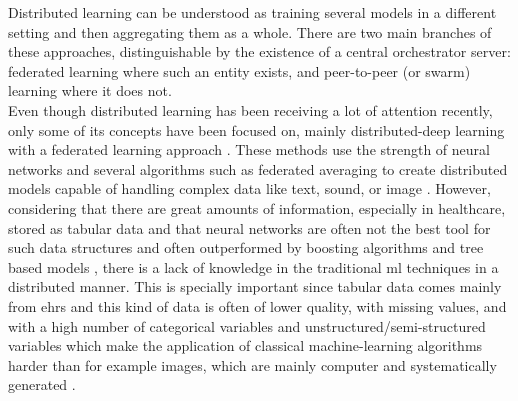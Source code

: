 
Distributed learning \cite{distributed} can be understood as training several models in a different setting and then aggregating them as a whole. There are two main branches of these approaches, distinguishable by the existence of a central orchestrator server: federated learning where such an entity exists, and peer-to-peer (or swarm) \cite{swarm_learning} learning where it does not. \\
Even though distributed learning has been receiving a lot of attention recently, only some of its concepts have been focused on, mainly distributed-deep learning with a federated learning approach \cite{xuFederatedLearningHealthcare2021,leeFederatedLearningClinical2020}. These methods use the strength of neural networks and several algorithms such as federated averaging to create distributed models capable of handling complex data like text, sound, or image \cite{prayitnoSystematicReviewFederated2021}. However, considering that there are great amounts of information, especially in healthcare, stored as tabular data \cite{alvarezsanchezTAQIHToolTabular2019,dimartinoExplainableAIClinical2022,payrovnaziriExplainableArtificialIntelligence2020,mcelfreshWhenNeuralNets2023,klambauerSelfNormalizingNeuralNetworks2017} and that neural networks are often not the best tool for such data structures and often outperformed by boosting algorithms and tree based models \cite{borisovDeepNeuralNetworks2022a,grinsztajnWhyTreebasedModels2022a}, there is a lack of knowledge in the traditional \ac{ml} techniques in a distributed manner. This is specially important since tabular data comes mainly from \acp{ehr} and this kind of data is often of lower quality, with missing values, and with a high number of categorical variables and unstructured/semi-structured variables which make the application of classical machine-learning algorithms harder than for example images, which are mainly computer and systematically generated \cite{peekThreeControversiesHealth2018}.


